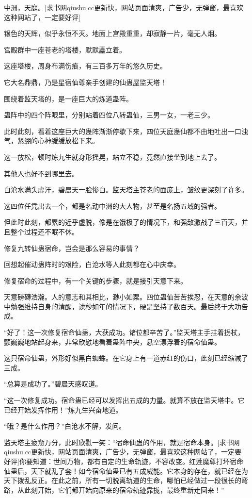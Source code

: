 
\begin{this_body}

中洲，天庭。[求书网qiushu.cc更新快，网站页面清爽，广告少，无弹窗，最喜欢这种网站了，一定要好评]

银色的天辉，似乎永恒不灭。地面上宫殿重重，却寂静一片，毫无人烟。

宫殿群中一座苍老的塔楼，默默矗立着。

这座塔楼，周身布满伤痕，有三百多万年的悠久历史。

它大名鼎鼎，乃是星宿仙尊亲手创建的仙蛊屋监天塔！

围绕着监天塔的，是一座巨大的炼道蛊阵。

蛊阵中的四个阵眼里，分别站着四位八转蛊仙，三男一女，一老三少。

此时此刻，看着这座巨大的蛊阵渐渐停歇下来，四位天庭蛊仙都不由地吐出一口浊气，紧绷的心神缓缓放松下来。

这一放松，顿时炼九生就身形摇晃，站立不稳，竟然直接坐到地上去了。

其他人也好不到哪里去。

白沧水满头虚汗，碧晨天一脸惨白。监天塔主苍老的面庞上，皱纹更深刻了许多。

这四位任凭出去一个，都是名动中洲的大人物，甚至是名扬五域的强者。

但此时此刻，都累的近乎虚脱，像是在饿极了的情况下，和强敌激战了三百天，并且整个过程还不眠不休。

修复九转仙蛊宿命，岂会是那么容易的事情？

回想起催动蛊阵时的艰险，白沧水等人此刻都在心中庆幸。

修复宿命的过程中，有一个关键的步骤，就是接引天意下来。

天意磅礴浩瀚。人的意志和其相比，渺小如粟。四位蛊仙苦苦挨忍，在天意的余波中勉强维持自身的清醒，读秒如年的情况下，硬是坚持了数百天。最后终于大功告成。

“好了！这一次修复宿命仙蛊，大获成功。诸位都辛苦了。”监天塔主手拄着拐杖，颤巍巍地站起身来，非常欣慰地看着蛊阵中央，悬空漂浮着的宿命仙蛊。

这只宿命仙蛊，外形好似黑白蜘蛛。在它身上有一道赤红的伤口，此刻已经缩减了三成。

“总算是成功了。”碧晨天感叹道。

“这一次修复成功。宿命蛊已经可以发挥出五成的力量。就算不放在监天塔中。它已经开始发挥作用！”炼九生兴奋地道。

“哦？是什么作用？”白沧水不解，发问。

监天塔主疲惫万分，此时欣慰一笑：“宿命仙蛊的作用，就是宿命本身。[求书网qiushu.cc更新快，网站页面清爽，广告少，无弹窗，最喜欢这种网站了，一定要好评]你要知道：世间万物，都有自定的生命轨迹，不容改变。红莲魔尊打坏宿命仙蛊后，天下就乱了套！如今宿命仙蛊已有五成威能。它本身的存在，就已经在为天下拨乱反正。在此之前，所有一切脱离轨道的生命，哪怕已经做过一段很长的弯路，从此刻开始，它们都开始向原来的宿命轨迹靠拢，最终重新走回来！”


\end{this_body}
